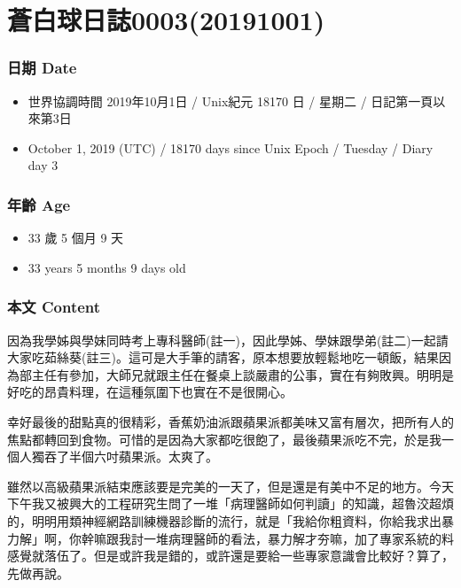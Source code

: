 \documentclass[a5paper, 12pt
]{book}
\providecommand{\tightlist}{%
  \setlength{\itemsep}{0pt}\setlength{\parskip}{0pt}}
\begin{document}
\hypertarget{ux84bcux767dux7403ux65e5ux8a8c000320191001}{%
\section{蒼白球日誌0003(20191001)}\label{ux84bcux767dux7403ux65e5ux8a8c000320191001}}

\hypertarget{ux65e5ux671f-date}{%
\subsubsection{日期 Date}\label{ux65e5ux671f-date}}

\begin{itemize}
\tightlist
\item
  世界協調時間 2019年10月1日 / Unix紀元 18170 日 / 星期二 /
  日記第一頁以來第3日
\item
  October 1, 2019 (UTC) / 18170 days since Unix Epoch / Tuesday / Diary
  day 3
\end{itemize}

\hypertarget{ux5e74ux9f61-age}{%
\subsubsection{年齡 Age}\label{ux5e74ux9f61-age}}

\begin{itemize}
\tightlist
\item
  33 歲 5 個月 9 天
\item
  33 years 5 months 9 days old
\end{itemize}

\hypertarget{ux672cux6587-content}{%
\subsubsection{本文 Content}\label{ux672cux6587-content}}

因為我學姊與學妹同時考上專科醫師(註一)，因此學姊、學妹跟學弟(註二)一起請大家吃茹絲葵(註三)。這可是大手筆的請客，原本想要放輕鬆地吃一頓飯，結果因為部主任有參加，大師兄就跟主任在餐桌上談嚴肅的公事，實在有夠敗興。明明是好吃的昂貴料理，在這種氛圍下也實在不是很開心。

幸好最後的甜點真的很精彩，香蕉奶油派跟蘋果派都美味又富有層次，把所有人的焦點都轉回到食物。可惜的是因為大家都吃很飽了，最後蘋果派吃不完，於是我一個人獨吞了半個六吋蘋果派。太爽了。

雖然以高級蘋果派結束應該要是完美的一天了，但是還是有美中不足的地方。今天下午我又被興大的工程研究生問了一堆「病理醫師如何判讀」的知識，超魯洨超煩的，明明用類神經網路訓練機器診斷的流行，就是「我給你粗資料，你給我求出暴力解」啊，你幹嘛跟我討一堆病理醫師的看法，暴力解才夯嘛，加了專家系統的料感覺就落伍了。但是或許我是錯的，或許還是要給一些專家意識會比較好？算了，先做再說。
\end{document}
